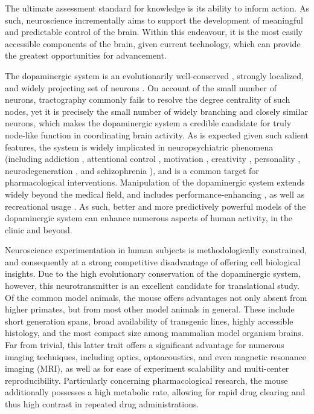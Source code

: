 The ultimate assessment standard for knowledge is its ability to inform action.
As such, neuroscience incrementally aims to support the development of meaningful and predictable control of the brain.
Within this endeavour, it is the most easily accessible components of the brain, given current technology, which can provide the greatest opportunities for advancement.

The dopaminergic system is an evolutionarily well-conserved \cite{Yamamoto2011}, strongly localized, and widely projecting set of neurons \cite{Aransay2015,Fields2007,Ikemoto2007,Hnasko2012}.
On account of the small number of neurons, tractography commonly fails to resolve the degree centrality of such nodes, yet it is precisely the small number of widely branching and closely similar neurons, which makes the dopaminergic system a credible candidate for truly node-like function in coordinating brain activity.
As is expected given such salient features, the system is widely implicated in neuropsychiatric phenomena (including
addiction \cite{DiChiara1988,DiChiara1999},
attentional control \cite{Nieoullon2002},
motivation \cite{Salamone1994},
creativity \cite{hermahini2010},
personality \cite{Depue1999},
neurodegeneration \cite{Masliah2000},
and schizophrenia \cite{Howes2009}),
and is a common target for pharmacological interventions.
Manipulation of the dopaminergic system extends widely beyond the medical field, and includes performance-enhancing \cite{Mehta2000,Turner2003}, as well as recreational usage \cite{DiChiara1988}.
As such, better and more predictively powerful models of the dopaminergic system can enhance numerous aspects of human activity, in the clinic and beyond.

Neuroscience experimentation in human subjects is methodologically constrained, and consequently at a strong competitive disadvantage of offering cell biological insights.
Due to the high evolutionary conservation of the dopaminergic system, however, this neurotransmitter is an excellent candidate for translational study.
Of the common model animals, the mouse offers advantages not only absent from higher primates, but from most other model animals in general.
These include short generation spans, broad availability of transgenic lines, highly accessible histology, and the most compact size among mammalian model organism brains.
Far from trivial, this latter trait offers a significant advantage for numerous imaging techniques, including optics, optoacoustics, and even magnetic resonance imaging (MRI), as well as for ease of experiment scalability and multi-center reproducibility.
Particularly concerning pharmacological research, the mouse additionally possesses a high metabolic rate, allowing for rapid drug clearing and thus high contrast in repeated drug administrations.


